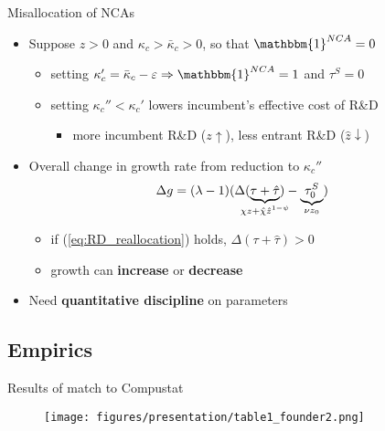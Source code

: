 \documentclass[english,usenames,dvipsnames,handout]{beamer}
\begin{document}
\begin{frame}{Misallocation of NCAs}\label{misallocation_of_nca}
	\hyperlink{efficiency}{} 
	\begin{itemize}
		\item Suppose $z > 0$ and $\kappa_c > \bar{\kappa}_c > 0$, so that $\mathbbm{1}^{NCA} = 0$ 
		\begin{itemize}
			\item setting $\kappa_c' = \bar{\kappa}_c - \varepsilon \Rightarrow \mathbbm{1}^{NCA} = 1$ and $\tau^S = 0$
			\item setting $\kappa_c'' < \kappa_c'$ lowers incumbent's effective cost of R\&D
			\begin{itemize}
				\item more incumbent R\&D ($z \uparrow$), less entrant R\&D ($\hat{z} \downarrow$)
			\end{itemize}
		\end{itemize}
		\item Overall change in growth rate from reduction to $\kappa_c''$
		\begin{align*}
		\Delta g  &= (\lambda -1) (\Delta (\underbrace{\tau + \hat{\tau}}_{\mathclap{\chi z + \hat{\chi} \hat{z}^{1-\psi}}}) - \underbrace{\tau^S_0}_{\mathclap{ \nu z_0}})
		\end{align*}
		\begin{itemize}
			\item if (\ref{eq:RD_reallocation}) holds, $\Delta(\tau+ \hat{\tau}) > 0$ 
			\item growth can \alert{\textbf{increase}} or \alert{\textbf{decrease}}  
		\end{itemize}
		\item Need \alert{\textbf{quantitative discipline}} on parameters
	\end{itemize}
\end{frame}

\subsection{Empirics}


\begin{frame}{Results of match to Compustat}\label{results_of_match}
	\hyperlink{economic_magnitude}{}
	\begin{figure}
		\texttt{[image: figures/presentation/table1\_founder2.png]}
	\end{figure}
\end{frame}
\end{document}

